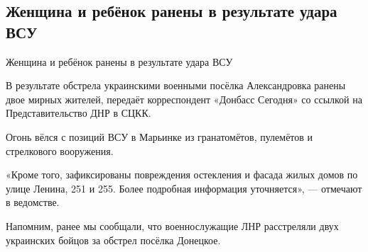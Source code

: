  
 

\subsection{Женщина и ребёнок ранены в результате удара ВСУ}
\label{sec:15_07_2020.fb.lnr.2}

\cite{15_07_2020.fb.lnr.2}
  
Женщина и ребёнок ранены в результате удара ВСУ

В результате обстрела украинскими военными посёлка Александровка ранены двое
мирных жителей, передаёт корреспондент «Донбасс Сегодня» со ссылкой на
Представительство ДНР в СЦКК.

Огонь вёлся с позиций ВСУ в Марьинке из гранатомётов, пулемётов и стрелкового
вооружения.

«Кроме того, зафиксированы повреждения остекления и фасада жилых домов по улице
Ленина, 251 и 255. Более подробная информация уточняется», --- отмечают в
ведомстве.

Напомним, ранее мы сообщали, что военнослужащие ЛНР расстреляли двух украинских
бойцов за обстрел посёлка Донецкое.

